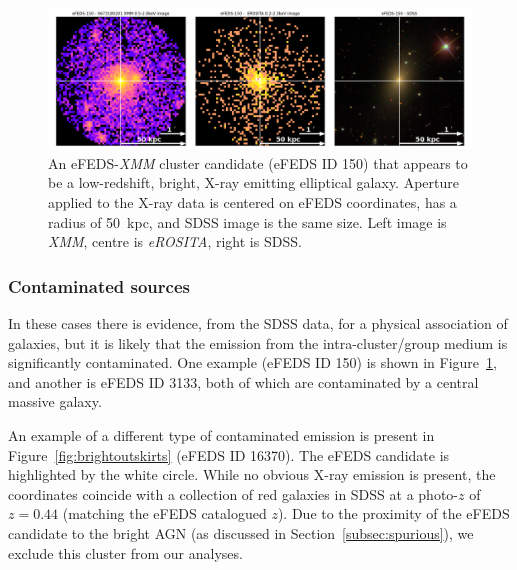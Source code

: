 \documentclass[fleqn,usenatbib]{mnras}
\begin{document}
\begin{figure}
    \centering
    \includegraphics[width=1\textwidth]{images/elliptical_xray.png}
    \caption[]{An eFEDS-{\em XMM} cluster candidate (eFEDS ID 150) that appears to be a low-redshift, bright, X-ray emitting elliptical galaxy. Aperture applied to the X-ray data is centered on eFEDS coordinates, has a radius of 50~kpc, and SDSS image is the same size. Left image is {\em XMM}, centre is {\em eROSITA}, right is SDSS.}
    \label{fig:ellipticalxray}
\end{figure}

\subsubsection{Contaminated sources}
\label{subsubsec:contamsrc}

In these cases there is evidence, from the SDSS data, for a physical association of galaxies, but it is likely that the emission from the intra-cluster/group medium is significantly contaminated. One example (eFEDS ID 150) is shown in Figure~\ref{fig:ellipticalxray}, and another is eFEDS ID 3133, both of which are contaminated by a central massive galaxy.

An example of a different type of contaminated emission is present in Figure~\ref{fig:brightoutskirts} (eFEDS ID 16370). The eFEDS candidate is highlighted by the white circle.  While no obvious X-ray emission is present, the coordinates coincide with a collection of red galaxies in SDSS at a photo-$z$ of $z=0.44$ (matching the eFEDS catalogued $z$).  Due to the proximity of the eFEDS candidate to the bright AGN (as discussed in Section~\ref{subsec:spurious}), we exclude this cluster from our analyses.

\end{document}

